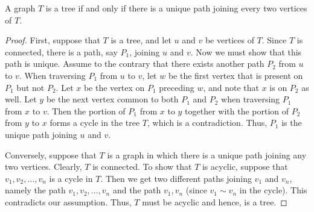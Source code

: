 \begin{Theorem}\label{thm:UniPath}
A graph $T$ is a tree if and only if there is a unique path joining every two vertices of $T$.
\end{Theorem}
\begin{proof}
First, suppose that $T$ is a tree, and let $u$ and $v$ be vertices of $T$. Since $T$ is connected, there is a path, say $P_1$, joining $u$ and $v$. Now we must show that this path is unique. Assume to the contrary that there exists another path $P_2$ from $u$ to $v$. When traversing $P_1$ from $u$ to $v$, let $w$ be the first vertex that is present on $P_1$ but not $P_2$. Let $x$ be the vertex on $P_1$ preceding $w$, and note that $x$ is on $P_2$ as well. Let $y$ be the next vertex common to both $P_1$ and $P_2$ when traversing $P_1$ from $x$ to $v$. Then the portion of $P_1$ from $x$ to $y$ together with the portion of $P_2$ from $y$ to $x$ forms a cycle in the tree $T$, which is a contradiction. Thus, $P_1$ is the unique path joining $u$ and $v$.

Conversely, suppose that $T$ is a graph in which there is a unique path joining any two vertices. Clearly, $T$ is connected. To show that $T$ is acyclic, suppose that $v_1, v_2, \ldots, v_n$ is a cycle in $T$. Then we get two different paths joining $v_1$ and $v_n$, namely the path $v_1, v_2, \ldots, v_n$ and the path $v_1, v_n$ (since $v_1 \sim v_n$ in the cycle). This contradicts our assumption. Thus, $T$ must be acyclic and hence, is a tree.
\end{proof}

